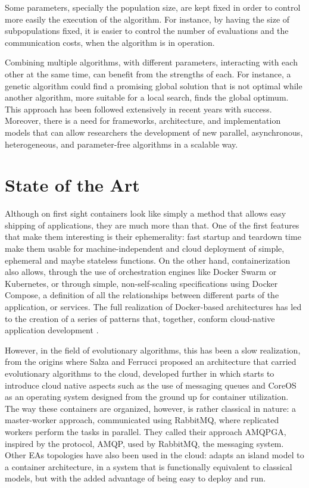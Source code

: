 \documentclass[review]{elsarticle}
\begin{document}
Some parameters, specially the population size, are
kept fixed in order to control more easily the execution of the algorithm. For
instance, by having the size of subpopulations fixed, it is easier to control
the number of evaluations and the communication costs, when the algorithm is in
operation. %

Combining multiple algorithms, with different parameters, interacting with each
other at the same time, can benefit from the strengths of each. For instance, a
genetic algorithm could find a promising global solution that is not optimal
while another algorithm, more suitable for a local search, finds the global
optimum. This approach has been followed extensively in recent years with
success. %
Moreover, there is a need for frameworks, architecture, and
implementation models that can allow researchers the development of new
parallel, asynchronous, heterogeneous, and parameter-free algorithms in a scalable way.  

\section{State of the Art} 
\label{soa}

Although on first sight containers look like simply a method that
allows easy shipping of applications, they are much more than
that. One of the first features that make them interesting is their
ephemerality: fast startup and teardown time make them usable for
machine-independent and cloud deployment of simple, ephemeral and
maybe stateless functions. On the other hand, containerization also
allows, through the use of orchestration engines like Docker Swarm or
Kubernetes, or through simple, non-self-scaling specifications using
Docker Compose, a definition of all the relationships between
different parts of the application, or services. The full realization
of Docker-based architectures has led to the creation of a series of
patterns that, together, conform cloud-native application development
\cite{kratzke2017understanding}.

However, in the field of evolutionary algorithms, this has been a slow
realization, from the origins where Salza and Ferrucci
\cite{salza2016approach,salza2016develop} proposed an architecture
that carried evolutionary algorithms to the cloud, developed further
in \cite{de2017parallel} which starts to introduce cloud native
aspects such as the use of messaging queues and CoreOS as an operating
system designed from the ground up for container utilization. The way
these containers are organized, however, is rather classical in
nature: a master-worker approach, communicated using RabbitMQ, where
replicated workers perform the tasks in parallel. They called their
approach AMQPGA, inspired by the protocol, AMQP, used by RabbitMQ, the
messaging system. Other EAs topologies have also been used in the
cloud: \cite{dziurzanski2020scalable} adapts an island model to a
container architecture, in a system that is functionally equivalent to
classical models, but with the added advantage of being easy to deploy
and run.
\end{document}
